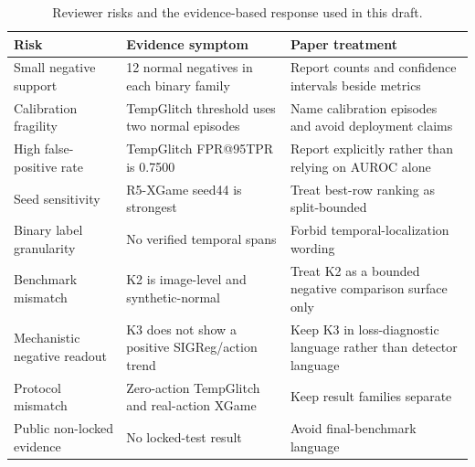 \begin{table}[t]
\caption{Reviewer risks and the evidence-based response used in this draft.}
\label{tab:reviewer-risk}
\centering
\small
\begin{tabularx}{\textwidth}{@{}lXX@{}}
\toprule
Risk & Evidence symptom & Paper treatment \\
\midrule
Small negative support & 12 normal negatives in each binary family & Report counts and confidence intervals beside metrics \\
Calibration fragility & TempGlitch threshold uses two normal episodes & Name calibration episodes and avoid deployment claims \\
High false-positive rate & TempGlitch FPR@95TPR is 0.7500 & Report explicitly rather than relying on AUROC alone \\
Seed sensitivity & R5-XGame seed44 is strongest & Treat best-row ranking as split-bounded \\
Binary label granularity & No verified temporal spans & Forbid temporal-localization wording \\
Benchmark mismatch & K2 is image-level and synthetic-normal & Treat K2 as a bounded negative comparison surface only \\
Mechanistic negative readout & K3 does not show a positive SIGReg/action trend & Keep K3 in loss-diagnostic language rather than detector language \\
Protocol mismatch & Zero-action TempGlitch and real-action XGame & Keep result families separate \\
Public non-locked evidence & No locked-test result & Avoid final-benchmark language \\
\bottomrule
\end{tabularx}
\end{table}
